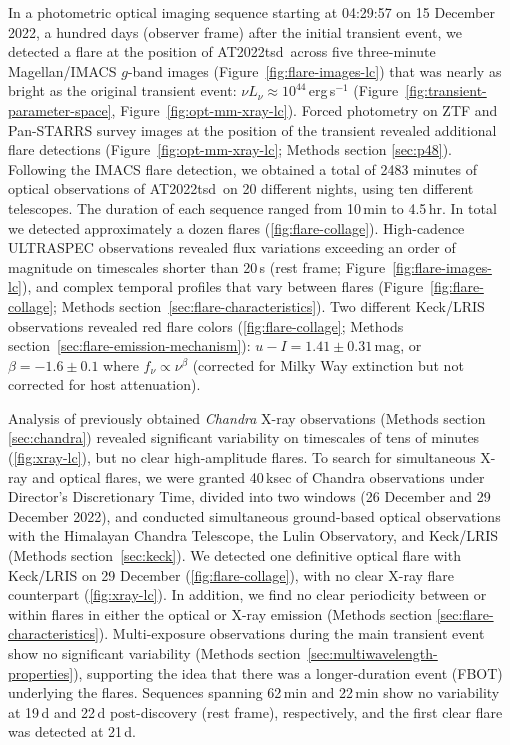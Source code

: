 \documentclass{nature_plusfigure}
\newcommand{\at}{AT2022tsd}
\begin{document}
In a photometric optical imaging sequence starting at 04:29:57 on 15 December 2022, a hundred days (observer frame) after the initial transient event, we detected\cite{Ho2022_Astronote_Flares} a flare at the position of \at\ across five three-minute Magellan/IMACS $g$-band images (Figure~\ref{fig:flare-images-lc}) that was nearly as bright as the original transient event: $\nu L_\nu \approx 10^{44}\,$erg\,s$^{-1}$ (Figure~\ref{fig:transient-parameter-space}, Figure~\ref{fig:opt-mm-xray-lc}).
Forced photometry on ZTF and Pan-STARRS survey\cite{Tonry2012,Chambers2016} images at the position of the transient revealed additional flare detections (Figure~\ref{fig:opt-mm-xray-lc}; Methods section \ref{sec:p48}).
Following the IMACS flare detection, we obtained a total of 2483 minutes of optical observations of \at\ on 20 different nights, using ten different telescopes. The duration of each sequence ranged from 10\,min to 4.5\,hr. In total we detected approximately a dozen flares (\ref{fig:flare-collage}). High-cadence ULTRASPEC\cite{Dhillon2014} observations revealed flux variations exceeding an order of magnitude on timescales shorter than 20\,s (rest frame; Figure~\ref{fig:flare-images-lc}), and complex temporal profiles that vary between flares (Figure~\ref{fig:flare-collage}; Methods section~\ref{sec:flare-characteristics}).
Two different Keck/LRIS observations revealed red flare colors (\ref{fig:flare-collage}; Methods section~\ref{sec:flare-emission-mechanism}):
$u-I=1.41\pm0.31\,$mag, or $\beta=-1.6\pm0.1$ where
$f_\nu \propto \nu^{\beta}$ (corrected for Milky Way extinction but not corrected for host attenuation).

Analysis of previously obtained \emph{Chandra} X-ray observations\cite{Matthews2022} (Methods section \ref{sec:chandra}) revealed significant variability on timescales of tens of minutes (\ref{fig:xray-lc}), but no clear high-amplitude flares. To search for simultaneous X-ray and optical flares,
we were granted 40\,ksec of Chandra observations under Director's Discretionary Time, divided into two windows (26 December and 29 December 2022),
and conducted simultaneous ground-based optical observations with the Himalayan Chandra Telescope, the Lulin Observatory, and Keck/LRIS (Methods section~\ref{sec:keck}). We detected one definitive optical flare with Keck/LRIS on 29 December (\ref{fig:flare-collage}), with no clear X-ray flare counterpart (\ref{fig:xray-lc}).
In addition, we find no clear periodicity between or within flares in either the optical or X-ray emission (Methods section \ref{sec:flare-characteristics}).
Multi-exposure observations during the main transient event show no significant variability (Methods section~\ref{sec:multiwavelength-properties}), supporting the idea that there was a longer-duration event (FBOT) underlying the flares.
Sequences spanning 62\,min and 22\,min show no variability at 19\,d and 22\,d post-discovery (rest frame), respectively, and the first clear flare was detected at 21\,d.
\end{document}
